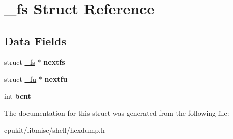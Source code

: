 \hypertarget{struct__fs}{}\section{\+\_\+fs Struct Reference}
\label{struct__fs}
\subsection*{Data Fields}
\begin{DoxyCompactItemize}
\item 
\mbox{\label{struct__fs_afe9cd166d992db5a5b491177d790a7c6}} 
struct \mbox{\hyperlink{struct__fs}{\+\_\+fs}} $\ast$ {\bfseries nextfs}
\item 
\mbox{\label{struct__fs_a48c7d4647170e78e4d360855ad973cb4}} 
struct \mbox{\hyperlink{struct__fu}{\+\_\+fu}} $\ast$ {\bfseries nextfu}
\item 
\mbox{\label{struct__fs_a3646de3a0ae1cfa2d482669a65aed2d7}} 
int {\bfseries bcnt}
\end{DoxyCompactItemize}


The documentation for this struct was generated from the following file\+:\begin{DoxyCompactItemize}
\item 
cpukit/libmisc/shell/hexdump.\+h\end{DoxyCompactItemize}
